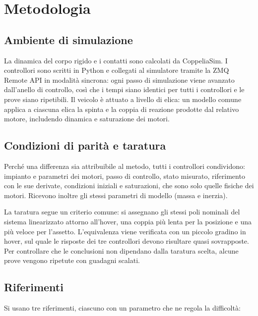 \documentclass[11pt,a4paper]{article}
\begin{document}
\section{Metodologia}

\subsection{Ambiente di simulazione}

La dinamica del corpo rigido e i contatti sono calcolati da CoppeliaSim. I controllori sono scritti in Python e collegati al simulatore tramite la ZMQ Remote API in modalità sincrona: ogni passo di simulazione viene avanzato dall'anello di controllo, così che i tempi siano identici per tutti i controllori e le prove siano ripetibili. Il veicolo è attuato a livello di elica: un modello comune applica a ciascuna elica la spinta e la coppia di reazione prodotte dal relativo motore, includendo dinamica e saturazione dei motori.

\subsection{Condizioni di parità e taratura}

Perché una differenza sia attribuibile al metodo, tutti i controllori condividono: impianto e parametri dei motori, passo di controllo, stato misurato, riferimento con le sue derivate, condizioni iniziali e saturazioni, che sono solo quelle fisiche dei motori. Ricevono inoltre gli stessi parametri di modello (massa e inerzia).

La taratura segue un criterio comune: si assegnano gli stessi poli nominali del sistema linearizzato attorno all'hover, una coppia più lenta per la posizione e una più veloce per l'assetto. L'equivalenza viene verificata con un piccolo gradino in hover, sul quale le risposte dei tre controllori devono risultare quasi sovrapposte. Per controllare che le conclusioni non dipendano dalla taratura scelta, alcune prove vengono ripetute con guadagni scalati.

\subsection{Riferimenti}

Si usano tre riferimenti, ciascuno con un parametro che ne regola la difficoltà:
\end{document}
